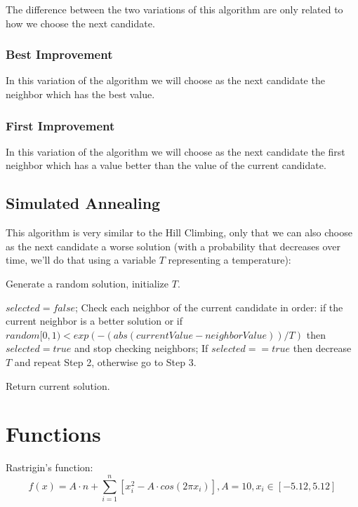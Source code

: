 \documentclass[a4paper]{article}
\begin{document}
The difference between the two variations of this algorithm are only related to how we choose the next candidate.

\subsubsection{Best Improvement}

In this variation of the algorithm we will choose as the next candidate the neighbor which has the best value.

\subsubsection{First Improvement}

In this variation of the algorithm we will choose as the next candidate the first neighbor which has a value better than the value of the current candidate.

\subsection{Simulated Annealing}

This algorithm is very similar to the Hill Climbing, only that we can also choose as the next candidate a worse solution (with a probability that decreases over time, we'll do that using a variable $T$ representing a temperature):

\begin{steps}
	\item Generate a random solution, initialize $T$.
	\item $selected = false$; Check each neighbor of the current candidate in order: if the current neighbor is a better solution or if $random[0,1) < exp(-(abs(currentValue-neighborValue))/T)$ then $selected = true$ and stop checking neighbors; If $selected == true$ then decrease $T$ and repeat Step 2, otherwise go to Step 3.
	\item Return current solution.
\end{steps}

\section{Functions}

Rastrigin's function:
$$ f(x) = A \cdot n + \sum_{i=1}^n \left[ x_i^2 - A \cdot cos(2 \pi x_i) \right],
A = 10, x_i \in \left[ -5.12, 5.12 \right]$$
\\
\end{document}
